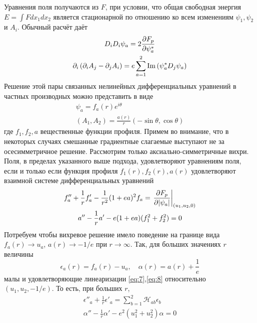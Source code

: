 Уравнения поля получаются из \( F \), при условии, что общая свободная энергия 
\( E = \int F dx_1 dx_2 \) является стационарной по отношению ко всем 
изменениям \( \psi_1, \psi_2 \) и \( A_i \). Обычный расчёт даёт 
\begin{gather}
    D_i D_i \psi_a = 2\frac{\partial F_p}{\partial \psi_a^{*}}
    \label{eq:4} \\
    \partial_i \left( \partial_i A_j - \partial_j A_i \right) = 
        e\sum\limits_{a=1}^{2}\mathrm{Im} \left( \psi_a^* D_j \psi_a \right)
    \label{eq:5}
\end{gather}
Решение этой пары связанных нелинейных дифференциальных уравнений в частных 
производных можно представить в виде
\begin{gather}
    \psi_a = f_a(r)e^{i\theta} \nonumber \\
    (A_1, A_2) = \frac{a(r)}{r}(-\sin\theta, \cos\theta)
    \label{eq:6}
\end{gather}
где \( f_1, f_2, a \) вещественные функции профиля. Примем во внимание, что 
в некоторых случаях смешанные градиентные слагаемые выступают не за 
осесимметричное решение. Рассмотрим только аксиально-симметричные вихри. 
Поля, в пределах указанного выше подхода, удовлетворяют уравнениям поля, если и 
только если функция профиля \( f_1(r), f_2(r), a(r) \) удовлетворяют взаимной 
системе дифференциальных уравнений
\begin{gather}
    f''_a + \frac{1}{r} f'_a - \frac{1}{r^2}(1+ea)^2 f_a = 
        \left. \frac{\partial F_p}{\partial |\psi_a|} \right|_{(u_1, u_2, 0)}
    \label{eq:7} \\
    a'' - \frac{1}{r} a' - e(1+ea)(f_1^2+f_2^2) = 0
    \label{eq:8}
\end{gather}
Потребуем чтобы вихревое решение имело поведение на границе вида 
\( f_a(r) \rightarrow u_a \), \( a(r) \rightarrow -1/e \) при
\( r \rightarrow \infty \). Так, для больших значениях \( r \) величины
\begin{equation}
    \epsilon_a(r) = f_a(r) - u_a, \quad
    \alpha(r) = a(r) + \frac{1}{e}
    \label{eq:9}
\end{equation}
малы и удовлетворяющие линеаризации \eqref{eq:7},\eqref{eq:8} относительно 
\( (u_1, u_2, -1/e) \). То есть, при больших \( r \),
\begin{gather}
    \epsilon''_a + \frac{1}{r} \epsilon'_a = \sum\limits_{b=1}^{2}
        \mathcal{H}_{ab} \epsilon_b
    \label{eq:10} \\
    \alpha'' - \frac{1}{r} \alpha' - e^2(u_1^2 + u_2^2 )\alpha = 0
    \label{eq:11}
\end{gather}
